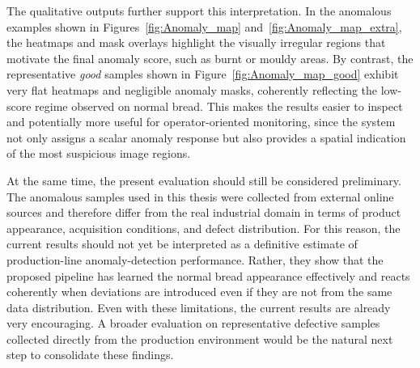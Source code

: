The qualitative outputs further support this interpretation. In the anomalous examples shown in Figures~\ref{fig:Anomaly_map} and~\ref{fig:Anomaly_map_extra}, the heatmaps and mask overlays highlight the visually irregular regions that motivate the final anomaly score, such as burnt or mouldy areas. By contrast, the representative \emph{good} samples shown in Figure~\ref{fig:Anomaly_map_good} exhibit very flat heatmaps and negligible anomaly masks, coherently reflecting the low-score regime observed on normal bread. This makes the results easier to inspect and potentially more useful for operator-oriented monitoring, since the system not only assigns a scalar anomaly response but also provides a spatial indication of the most suspicious image regions.

At the same time, the present evaluation should still be considered preliminary. The anomalous samples used in this thesis were collected from external online sources and therefore differ from the real industrial domain in terms of product appearance, acquisition conditions, and defect distribution. For this reason, the current results should not yet be interpreted as a definitive estimate of production-line anomaly-detection performance. Rather, they show that the proposed pipeline has learned the normal bread appearance effectively and reacts coherently when deviations are introduced even if they are not from the same data distribution. Even with these limitations, the current results are already very encouraging. A broader evaluation on representative defective samples collected directly from the production environment would be the natural next step to consolidate these findings.
